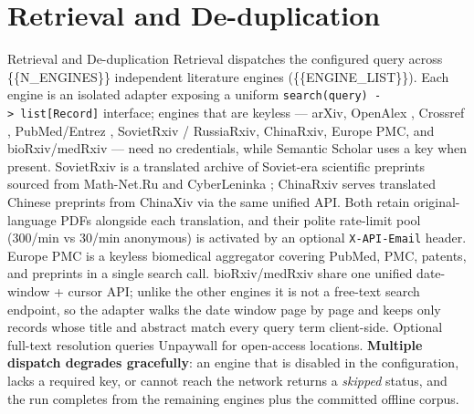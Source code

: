 \documentclass[
  ignorenonframetext,
]{beamer}
\author{}
\date{}
\begin{document}
\section{Retrieval and
De-duplication}\label{retrieval-and-de-duplication}

\begin{frame}{Retrieval and De-duplication}
Retrieval dispatches the configured query across \{\{N\_ENGINES\}\}
independent literature engines (\{\{ENGINE\_LIST\}\}). Each engine is an
isolated adapter exposing a uniform
\texttt{search(query)\ -\textgreater{}\ list{[}Record{]}} interface;
engines that are keyless --- arXiv, OpenAlex ,
Crossref , PubMed/Entrez
, SovietRxiv / RussiaRxiv, ChinaRxiv, Europe PMC,
and bioRxiv/medRxiv --- need no credentials, while Semantic Scholar
 uses a key when present. SovietRxiv is a
translated archive of Soviet-era scientific preprints sourced from
Math-Net.Ru and CyberLeninka \breakseq{[@sovietrxiv]}; ChinaRxiv serves
translated Chinese preprints from ChinaXiv via the same unified API.
Both retain original-language PDFs alongside each translation, and their
polite rate-limit pool (300/min vs 30/min anonymous) is activated by an
optional \texttt{X-API-Email} header. Europe PMC is a keyless biomedical
aggregator covering PubMed, PMC, patents, and preprints in a single
search call. bioRxiv/medRxiv share one unified date-window + cursor API;
unlike the other engines it is not a free-text search endpoint, so the
adapter walks the date window page by page and keeps only records whose
title and abstract match every query term client-side. Optional
full-text resolution queries Unpaywall  for
open-access locations. \textbf{Multiple dispatch degrades gracefully}:
an engine that is disabled in the configuration, lacks a required key,
or cannot reach the network returns a \emph{skipped} status, and the run
completes from the remaining engines plus the committed offline corpus.
\end{frame}
\end{document}

